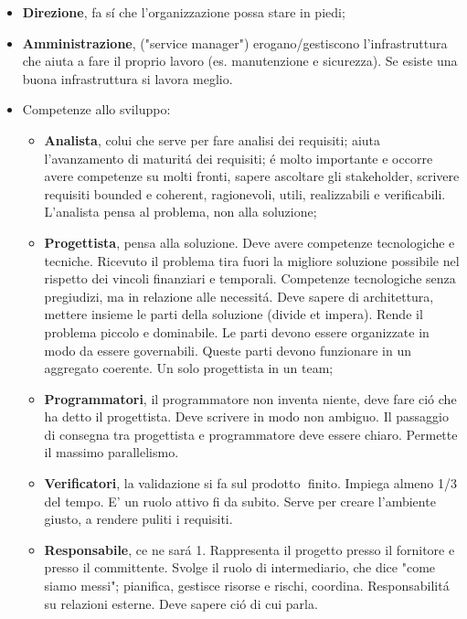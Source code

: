 \documentclass[a4paper,10pt] {article}
\begin{document}
\begin{itemize}
\begin{itemize}
\item \textbf{Direzione}, fa s\'i che l'organizzazione possa stare in piedi;

\item \textbf{Amministrazione}, ("service manager") erogano/gestiscono 
l'infrastruttura che aiuta a fare il proprio lavoro (es. manutenzione e 
sicurezza). Se esiste una buona infrastruttura si 
lavora meglio.


	\item Competenze allo sviluppo:
	\begin{itemize}
		
	\item \textbf{Analista}, colui che serve per fare analisi dei requisiti; 
	aiuta l'avanzamento di maturit\'a dei requisiti; \'e
	molto importante e occorre avere competenze su molti fronti, sapere 
	ascoltare gli stakeholder, scrivere requisiti bounded e coherent, 
	ragionevoli, utili, realizzabili e verificabili. L'analista pensa al 
	problema, non alla soluzione;
	
	
	\item \textbf{Progettista}, pensa alla soluzione. Deve avere competenze 
	tecnologiche e tecniche. Ricevuto il problema tira fuori la migliore 
	soluzione possibile nel rispetto dei vincoli finanziari e temporali. 
	Competenze tecnologiche senza pregiudizi, ma in relazione alle necessit\'a. 
	Deve sapere di architettura, mettere insieme le parti della soluzione 
	(divide et impera). Rende il problema piccolo e dominabile. Le
	parti devono essere organizzate in modo da essere governabili. Queste parti 
	devono funzionare in un aggregato coerente. Un solo progettista in un team;
	
	
	\item \textbf{Programmatori}, il programmatore non inventa niente, deve 
	fare ci\'o che ha detto il progettista. Deve scrivere in modo non ambiguo. 
	Il passaggio di consegna tra progettista e programmatore deve essere
	chiaro. Permette il massimo parallelismo. 
	
	
	\item \textbf{Verificatori}, la validazione si fa sul prodotto finito. 
	Impiega almeno 1/3 del tempo. E' un ruolo attivo fi da subito. Serve per 
	creare l'ambiente giusto, a rendere puliti i 
	requisiti.
	
	
	\item \textbf{Responsabile}, ce ne sar\'a 1. Rappresenta il progetto presso 
	il fornitore e presso il committente. Svolge il ruolo di intermediario, che 
	dice "come siamo messi"; pianifica, gestisce risorse e rischi,
	coordina. Responsabilit\'a su relazioni esterne. Deve sapere ci\'o di cui 
	parla. 



\end{itemize}
\end{itemize}
\end{itemize}
\end{document}
